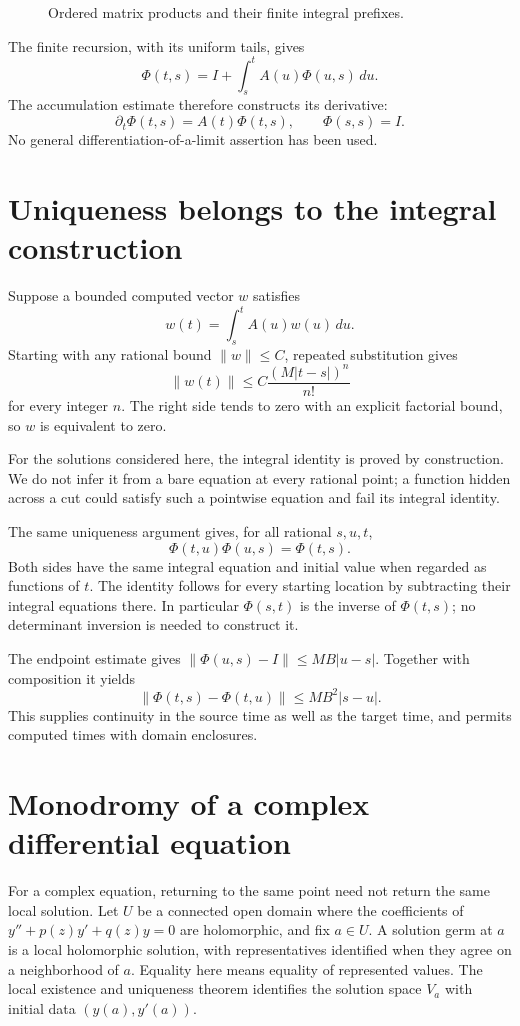 \begin{figure}[htbp]\centering
\peanoBakerWordsAnimation
\caption{Ordered matrix products and their finite integral prefixes.}
\end{figure}

The finite recursion, with its uniform tails, gives
\[
 \Phi(t,s)=I+\int_s^t A(u)\Phi(u,s)\,du.
\]
The accumulation estimate therefore constructs its derivative:
\[
 \partial_t\Phi(t,s)=A(t)\Phi(t,s),\qquad\Phi(s,s)=I.
\]
No general differentiation-of-a-limit assertion has been used.

\section{Uniqueness belongs to the integral construction}
Suppose a bounded computed vector $w$ satisfies
\[
 w(t)=\int_s^t A(u)w(u)\,du.
\]
Starting with any rational bound $\|w\|\le C$, repeated substitution gives
\[
 \|w(t)\|\le C\frac{(M|t-s|)^n}{n!}
\]
for every integer $n$.  The right side tends to zero with an explicit
factorial bound, so $w$ is equivalent to zero.

For the solutions considered here, the integral identity is proved by
construction.  We do not infer it from a bare equation at every rational
point; a function hidden across a cut could satisfy such a pointwise
equation and fail its integral identity.

The same uniqueness argument gives, for all rational $s,u,t$,
\[
 \boxed{\Phi(t,u)\Phi(u,s)=\Phi(t,s).}
\]
Both sides have the same integral equation and initial value when regarded
as functions of $t$.  The identity follows for every starting location by
subtracting their integral equations there.  In particular
$\Phi(s,t)$ is the inverse of $\Phi(t,s)$; no determinant inversion is
needed to construct it.

The endpoint estimate gives
$\|\Phi(u,s)-I\|\le MB|u-s|$.  Together with composition it yields
\[
 \|\Phi(t,s)-\Phi(t,u)\|\le MB^2|s-u|.
\]
This supplies continuity in the source time as well as the target time,
and permits computed times with domain enclosures.

\section{Monodromy of a complex differential equation}
\label{sec:ode-monodromy}

For a complex equation, returning to the same point need not return the
same local solution. Let $U$ be a connected open domain where the
coefficients of $y''+p(z)y'+q(z)y=0$ are holomorphic, and fix $a\in U$.
A solution germ at $a$ is a local holomorphic solution, with representatives
identified when they agree on a neighborhood of $a$. Equality here means
equality of represented values. The local existence and uniqueness theorem
identifies the solution space $V_a$ with initial data $(y(a),y'(a))$.

